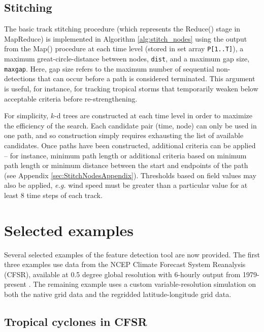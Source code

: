 \documentclass[gmdd, hvmath, online]{copernicus_discussions}
\begin{document}
\subsection{Stitching}

The basic track stitching procedure (which represents the Reduce() stage in MapReduce) is implemented in Algorithm \ref{alg:stitch_nodes} using the output from the Map() procedure at each time level (stored in set array \texttt{P[1..T]}), a maximum great-circle-distance between nodes, \texttt{dist}, and a maximum gap size, \texttt{maxgap}.  Here, gap size refers to the maximum number of sequential non-detections that can occur before a path is considered terminated.  This argument is useful, for instance, for tracking tropical storms that temporarily weaken below acceptable criteria before re-strengthening.

For simplicity, $k$-d trees are constructed at each time level in order to maximize the efficiency of the search.  Each candidate pair (time, node) can only be used in one path, and so construction simply requires exhausting the list of available candidates.  Once paths have been constructed, additional criteria can be applied -- for instance, minimum path length or additional criteria based on minimum path length or minimum distance between the start and endpoints of the path (see Appendix \ref{sec:StitchNodesAppendix}).  Thresholds based on field values may also be applied, \textit{e.g.} wind speed must be greater than a particular value for at least 8 time steps of each track.

\section{Selected examples} \label{sec:SelectedExamples}

Several selected examples of the feature detection tool are now provided.  The first three examples use data from the NCEP Climate Forecast System Reanalysis (CFSR), available at 0.5 degree global resolution with 6-hourly output from 1979-present \citep{saha2010ncep}.  The remaining example uses a custom variable-resolution simulation \citep{zarzycki2014multidecadal} on both the native grid data and the regridded latitude-longitude grid data.

\subsection{Tropical cyclones in CFSR} \label{sec:TropicalCycloneExample}
\end{document}
